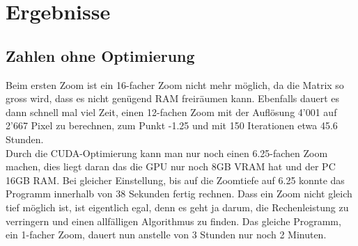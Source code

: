 \section{Ergebnisse}

\subsection{Zahlen ohne Optimierung}
Beim ersten Zoom ist ein 16-facher Zoom nicht mehr möglich, da die Matrix so gross wird, dass es nicht genügend RAM freiräumen kann. Ebenfalls dauert es dann schnell mal viel Zeit, einen 12-fachen Zoom mit der Auflösung 4'001 auf 2'667 Pixel zu berechnen, zum Punkt -1.25 und mit 150 Iterationen etwa 45.6 Stunden.\\
Durch die CUDA-Optimierung kann man nur noch einen 6.25-fachen Zoom machen, dies liegt daran das die GPU nur noch 8GB VRAM hat und der PC 16GB RAM. Bei gleicher Einstellung, bis auf die Zoomtiefe auf 6.25 konnte das Programm innerhalb von 38 Sekunden fertig rechnen. Dass ein Zoom nicht gleich tief möglich ist, ist eigentlich egal, denn es geht ja darum, die Rechenleistung zu verringern und einen allfälligen Algorithmus zu finden. Das gleiche Programm, ein 1-facher Zoom, dauert nun anstelle von 3 Stunden nur noch 2 Minuten.
